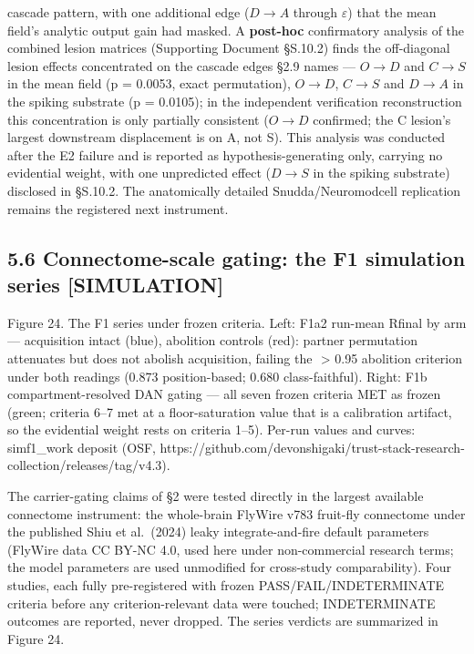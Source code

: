 \documentclass[
]{article}
\begin{document}
cascade pattern, with one additional edge (\(D{\to}A\) through
\(\varepsilon\)) that the mean field's analytic output gain had masked.
A \textbf{post-hoc} confirmatory analysis of the combined lesion
matrices (Supporting Document §S.10.2) finds the off-diagonal lesion
effects concentrated on the cascade edges §2.9 names --- \(O{\to}D\) and
\(C{\to}S\) in the mean field (p = 0.0053, exact permutation),
\(O{\to}D\), \(C{\to}S\) and \(D{\to}A\) in the spiking substrate (p =
0.0105); in the independent verification reconstruction this
concentration is only partially consistent (\(O{\to}D\) confirmed; the C
lesion's largest downstream displacement is on A, not S). This analysis
was conducted after the E2 failure and is reported as
hypothesis-generating only, carrying no evidential weight, with one
unpredicted effect (\(D{\to}S\) in the spiking substrate) disclosed in
§S.10.2. The anatomically detailed Snudda/Neuromodcell replication
remains the registered next instrument.

\subsection{5.6 Connectome-scale gating: the F1 simulation series
{[}SIMULATION{]}}\label{connectome-scale-gating-the-f1-simulation-series-simulation}

Figure 24. The F1 series under frozen criteria. Left: F1a2 run-mean
{Rfinal} by arm --- acquisition intact (blue), abolition controls (red):
partner permutation attenuates but does not abolish acquisition, failing
the { \textgreater{} 0.95} abolition criterion under both readings
(0.873 position-based; 0.680 class-faithful). Right: F1b
compartment-resolved DAN gating --- all seven frozen criteria MET as
frozen (green; criteria 6--7 met at a floor-saturation value that is a
calibration artifact, so the evidential weight rests on criteria 1--5).
Per-run values and curves: simf1\_work deposit (OSF,
https://github.com/devonshigaki/trust-stack-research-collection/releases/tag/v4.3).

The carrier-gating claims of §2 were tested directly in the largest
available connectome instrument: the whole-brain FlyWire v783 fruit-fly
connectome under the published Shiu et al.~(2024) leaky
integrate-and-fire default parameters (FlyWire data CC BY-NC 4.0, used
here under non-commercial research terms; the model parameters are used
unmodified for cross-study comparability). Four studies, each fully
pre-registered with frozen PASS/FAIL/INDETERMINATE criteria before any
criterion-relevant data were touched; INDETERMINATE outcomes are
reported, never dropped. The series verdicts are summarized in Figure
24.
\end{document}
